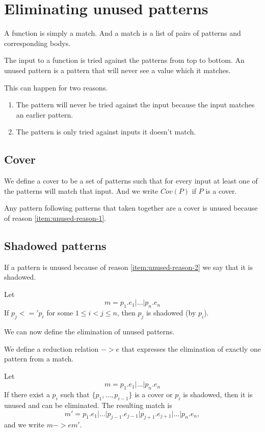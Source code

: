 \section{Eliminating unused patterns}
A function is simply a match. And a match is a list of pairs of patterns and
corresponding bodys.

The input to a function is tried against the patterns from top to bottom. An
unused pattern is a pattern that will never see a value which it matches.

This can happen for two reasons.
\begin{enumerate}
\item The pattern will never be tried against the input because the input
  matches an earlier pattern. \label{item:unused-reason-1}
\item The pattern is only tried against inputs it doesn't match. \label{item:unused-reason-2}
\end{enumerate}

\subsection{Cover}\label{sec:cover}
We define a cover to be a set of patterns such that for every input at least one
of the patterns will match that input. And we write $Cov(P)$ if $P$ is a cover.

Any pattern following patterns that taken together are a cover is unused because
of reason \ref{item:unused-reason-1}.

\subsection{Shadowed patterns}\label{sec:shadowed-patterns}
If a pattern is unused because of reason \ref{item:unused-reason-2} we say that
it is shadowed.
\begin{definition}[Shadowed]
  Let
  \[
  m = p_1\texttt{.}e_1 \texttt{|} \ldots \texttt{|} p_n\texttt{.}e_n
  \]
  If $p_j <=' p_i$ for some $1 \leq i < j \leq n$, then $p_j$ is shadowed (by
  $p_i$).
\end{definition}

We can now define the elimination of unused patterns.
\begin{definition}[Elimination, $->e$]
\label{def:shadowed-patterns-1}
  We define a reduction relation $->e$ that expresses the
  elimination of exactly one pattern from a match.

  Let
  \[
  m = p_1\texttt{.}e_1 \texttt{|} \ldots \texttt{|} p_n\texttt{.}e_n
  \]
  If there exist a $p_i$ such that $\{p_1, \ldots, p_{i-1}\}$ is a cover or
  $p_i$ is shadowed, then it is unused and can be eliminated. The resulting
  match is
  \[
  m' = p_1\texttt{.}e_1 \texttt{|} \ldots \texttt{|}
  p_{j-1}\texttt{.}e_{j-1} \texttt{|} p_{j+1}\texttt{.}e_{j+1} \texttt{|}
  \ldots \texttt{|} p_n\texttt{.}e_n,
  \]
  and we write $m ->e m'$.

\end{definition}

